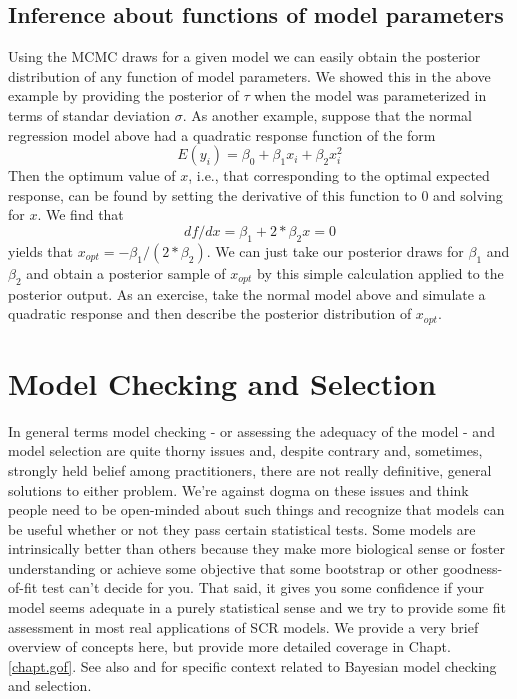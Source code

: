 \subsection{Inference about functions of model parameters}
\label{glms.sec.xopt}

Using the MCMC draws for a given model we can easily obtain the
posterior distribution of any function of model parameters.  We showed
this in the above example by providing the posterior of $\tau$ when
the model was parameterized in terms of standar deviation $\sigma$.
 As another example, suppose that the
normal regression model above had a quadratic response function of the
form
\[
	E(y_i) = \beta_0 + \beta_1 x_i + \beta_2 x_{i}^{2}
\]
Then the optimum value of $x$, i.e., that corresponding to the optimal
expected response, can be found by setting the derivative of
this function to 0 and solving for $x$. We find that
\[
df/dx = \beta_1 +
2*\beta_2 x = 0
\]
yields that $x_{opt} = -\beta_1/(2*\beta_2)$.  We can just
take our posterior draws for $\beta_1$ and $\beta_2$ and obtain a
posterior sample of $x_{opt}$ by this simple calculation applied to
the posterior output. As an exercise, take
the normal model above and simulate a quadratic response and then
describe the posterior distribution of $x_{opt}$.


\section{Model Checking and Selection}
\label{glms.sec.modsel}

In general terms model checking - or assessing the adequacy of the
model - and model selection are quite thorny issues and, despite
contrary and, sometimes, strongly held belief among practitioners, there are not
really definitive, general solutions to either problem. We're against
dogma on these issues and think people need to be open-minded about
such things and recognize that models can be useful whether or not
they pass certain statistical tests. Some models are intrinsically
better than others because they make more biological sense or foster
understanding or achieve some objective that some  bootstrap
or other goodness-of-fit test can't decide for you. That said, it
gives you some confidence if your model seems adequate in a purely statistical
sense and we try to
provide some fit assessment in most real applications of SCR models.
We provide a very brief overview of concepts here, but provide more
detailed coverage in Chapt. \ref{chapt.gof}.
See also
\citet[][ch. xyz]{kery:2010} and
\citet[][ch. xyz]{link_barker:2009}
for specific context related to Bayesian
model checking and selection.

